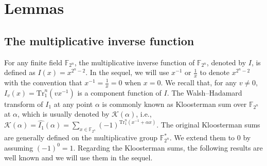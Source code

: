 \documentclass[runningheads,a4paper]{article}
\newtheorem{lemma}{Lemma}
\newtheorem{remark}{Remark}
\newcommand{\F}{\mathbb{F}}
\newcommand{\0}{\textbf{0}}
\newcommand{\1}{\textbf{1}}
\begin{document}

\section{Lemmas}
\subsection{The multiplicative inverse function}
For any finite field $\F_{2^n}$, the multiplicative inverse function of $\F_{2^n}$, denoted by $I$, is defined as $I(x)=x^{2^n-2}$. In the sequel, we will use $x^{-1}$ or $\frac{1}{x}$ to
denote $x^{2^n-2}$ with the convention that $x^{-1}=\frac{1}{x}=0$ when $x=0$. We recall that, for any $v \neq 0$, $I_v(x) = \mathrm{Tr}_1^n(vx^{-1})$ is a component function of $I$.
The Walsh--Hadamard transform of $I_1$ at any point $\alpha$ is commonly known as Kloosterman sum over $\F_{2^n}$ at $\alpha$, which is usually denoted by $\mathcal{K}(\alpha)$,
i.e., $\mathcal{K}(\alpha)=\widehat{I_1}(\alpha)=\sum_{x\in\F_{2^n}}(-1)^{\mathrm{Tr}_1^n(x^{-1}+\alpha x)}$.
The original Kloosterman sums are generally defined on the multiplicative group $\F_{2^n}^*$. We extend them to $0$ by assuming $(-1)^0=1$. Regarding the Kloosterman sums,
the following results are well known and we will use them in the sequel.
\end{document}
